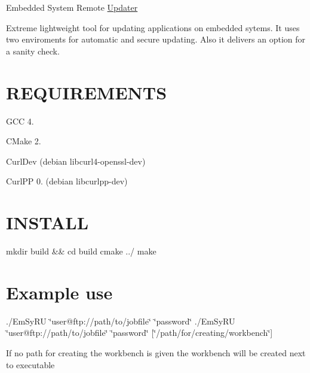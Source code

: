 Embedded System Remote \hyperlink{classUpdater}{Updater}

Extreme lightweight tool for updating applications on embedded sytems. It uses two enviroments for automatic and secure updating. Also it delivers an option for a sanity check.

\section*{R\-E\-Q\-U\-I\-R\-E\-M\-E\-N\-T\-S }


\begin{DoxyItemize}
\item G\-C\-C 4.
\item C\-Make 2.
\item Curl\-Dev (debian libcurl4-\/openssl-\/dev)
\item Curl\-P\-P 0. (debian libcurlpp-\/dev)
\end{DoxyItemize}

\section*{I\-N\-S\-T\-A\-L\-L }

mkdir build \&\& cd build cmake ../ make

\section*{Example use }

./\-Em\-Sy\-R\-U \char`\"{}user@ftp\-://path/to/jobfile\char`\"{} \char`\"{}password\char`\"{} ./\-Em\-Sy\-R\-U \char`\"{}user@ftp\-://path/to/jobfile\char`\"{} \char`\"{}password\char`\"{} \mbox{[}\char`\"{}/path/for/creating/workbench\char`\"{}\mbox{]}

If no path for creating the workbench is given the workbench will be created next to executable 